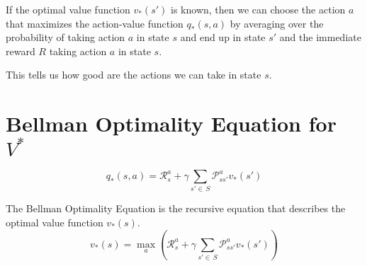 \begin{itemize}
\begin{center}
\end{center}

If the optimal value function $v_*(s')$ is known, then we can choose the
action $a$ that maximizes the action-value function $q_*(s,a)$ by
averaging over the probability of taking action $a$ in state $s$ and end
up in state $s'$ and the immediate reward $R$ taking action $a$ in state
$s$.

This tells us how good are the actions we can take in state $s$.


\section{Bellman Optimality Equation for $V^*$}\label{sec:bellman-optimality-equation-for-v}
\[
    q_*(s,a) = \mathcal{R}_{s}^{a} + \gamma\sum_{s'\in\,S}\mathcal{P}_{ss'}^{a}v_*(s')
\]

\begin{definition}
    The Bellman Optimality Equation is the recursive equation that describes the optimal value function $v_*(s)$.
    \[
        v_*(s) = \max_{a}\left(\mathcal{R}_{s}^{a} + \gamma\sum_{s'\in\,S}\mathcal{P}_{ss'}^{a}v_*(s')\right)
    \]
\end{definition}

\end{itemize}
